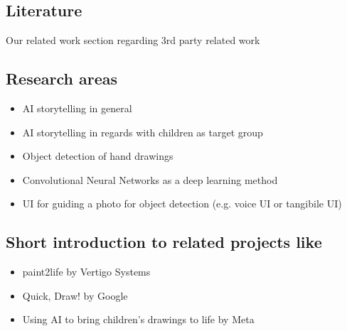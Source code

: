 \subsection{Literature}

Our related work section regarding 3rd party related work

\subsection{Research areas}
\begin{itemize}
    \item AI storytelling in general
    \item AI storytelling in regards with children as target group
    \item Object detection of hand drawings
    \item Convolutional Neural Networks as a deep learning method
    \item UI for guiding a photo for object detection (e.g. voice UI or tangibile UI)
\end{itemize}

\subsection{Short introduction to related projects like}
\begin{itemize}
    \item paint2life by Vertigo Systems
    \item Quick, Draw! by Google
    \item Using AI to bring children's drawings to life by Meta
\end{itemize}


